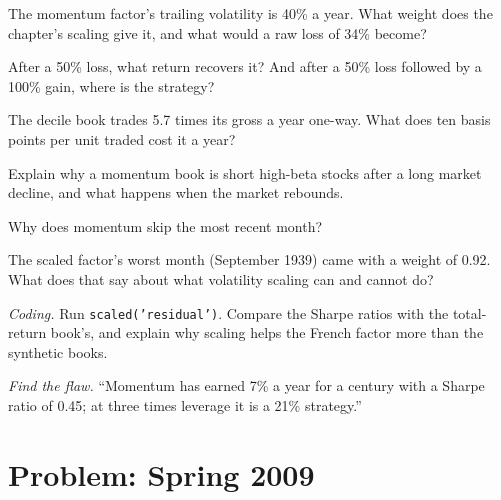 \begin{exercise}[$\star$]\label{exo:s1:momentum:1}
The momentum factor's trailing volatility is 40\% a year. What weight does the chapter's scaling give it, and what would a raw loss of 34\% become?
\end{exercise}

\begin{exercise}[$\star$]\label{exo:s1:momentum:2}
After a 50\% loss, what return recovers it? And after a 50\% loss followed by a 100\% gain, where is the strategy?
\end{exercise}

\begin{exercise}[$\star$]\label{exo:s1:momentum:3}
The decile book trades 5.7 times its gross a year one-way. What does ten basis points per unit traded cost it a year?
\end{exercise}

\begin{exercise}[$\star\star$]\label{exo:s1:momentum:4}
Explain why a momentum book is short high-beta stocks after a long market decline, and what happens when the market rebounds.
\end{exercise}

\begin{exercise}[$\star\star$]\label{exo:s1:momentum:5}
Why does momentum skip the most recent month?
\end{exercise}

\begin{exercise}[$\star\star$]\label{exo:s1:momentum:6}
The scaled factor's worst month (September 1939) came with a weight of 0.92. What does that say about what volatility scaling can and cannot do?
\end{exercise}

\begin{exercise}[$\star\star\star$]\label{exo:s1:momentum:7}
\emph{Coding.} Run \texttt{scaled('residual')}. Compare the Sharpe ratios with the total-return book's, and explain why scaling helps the French factor
more than the synthetic books.
\end{exercise}

\begin{exercise}[$\star\star\star$]\label{exo:s1:momentum:8}
\emph{Find the flaw.} ``Momentum has earned 7\% a year for a century with a Sharpe ratio of 0.45; at three times leverage it is a 21\% strategy.''
\end{exercise}

\section{Problem: Spring 2009}

